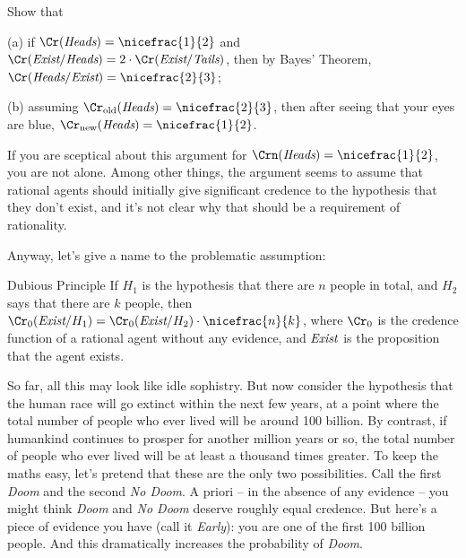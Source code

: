 \begin{exercise}{2}
  Show that
  \begin{enumerate*}
  \item[(a)] if $\Cr(\emph{Heads}) = \nicefrac{1}{2}$ and
    $\Cr(\emph{Exist}/\emph{Heads}) = 2 \cdot
    \Cr(\emph{Exist}/\emph{Tails})$, then by Bayes' Theorem,
    $\Cr(\emph{Heads}/\emph{Exist}) = \nicefrac{2}{3}$;
  \item[(b)] assuming
    $\Cr_\text{old}(\emph{Heads}) = \nicefrac{2}{3}$, then after
    seeing that your eyes are blue,
    $\Cr_\text{new}(\emph{Heads}) = \nicefrac{1}{2}$.
  \end{enumerate*}
  \vspace{-5mm}
\end{exercise}

If you are sceptical about this argument for $\Crn(\emph{Heads}) =
\nicefrac{1}{2}$, you are not alone. Among other things, the argument seems to
assume that rational agents should initially give significant credence
to the hypothesis that they don't exist, and it's not clear why that
should be a requirement of rationality.

Anyway, let's give a name to the problematic assumption:
\begin{genericthm}{Dubious Principle}
  If $H_1$ is the hypothesis that there are $n$ people in total, and
  $H_2$ says that there are $k$ people, then $\Cr_0(\emph{Exist} /
  H_1) = \Cr_0(\emph{Exist}/H_2) \cdot \nicefrac{n}{k}$, where $\Cr_0$
  is the credence function of a rational agent without any evidence,
  and $\emph{Exist}$ is the proposition that the agent exists.
\end{genericthm}

So far, all this may look like idle sophistry. But now consider the
hypothesis that the human race will go extinct within the next few
years, at a point where the total number of people who ever lived will
be around 100 billion. By contrast, if humankind continues to prosper
for another million years or so, the total number of people who ever
lived will be at least a thousand times greater. To keep the maths
easy, let's pretend that these are the only two possibilities. Call
the first \emph{Doom} and the second \emph{No Doom}. A priori -- in
the absence of any evidence -- you might think \emph{Doom} and
\emph{No Doom} deserve roughly equal credence. But here's a piece of
evidence you have (call it \emph{Early}): you are one of the first 100
billion people. And this dramatically increases the probability of
\emph{Doom}.

